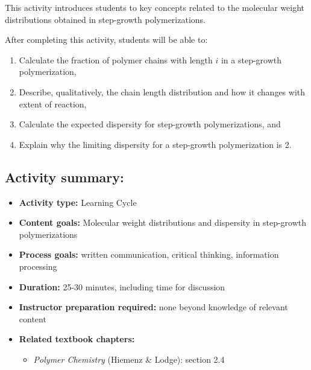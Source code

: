 %
%
%
%

\renewcommand{\figpath}{content/polymchem/stepgrowth/dispersity/figs}

\begin{activity}

\begin{instructornotes}

	This activity introduces students to key concepts related to the molecular weight distributions obtained in step-growth polymerizations.
	
	After completing this activity, students will be able to:
			\begin{enumerate}
				\item Calculate the fraction of polymer chains with length $i$ in a step-growth polymerization,
				\item Describe, qualitatively, the chain length distribution and how it changes with extent of reaction,
				\item Calculate the expected dispersity for step-growth polymerizations, and
				\item Explain why the limiting dispersity for a step-growth polymerization is 2.
			\end{enumerate}
			
	\subsection*{Activity summary:}
	\begin{itemize}
		\item \textbf{Activity type:} Learning Cycle
		\item \textbf{Content goals:} Molecular weight distributions and dispersity in step-growth polymerizations
		\item \textbf{Process goals:} %
			written communication, critical thinking, information processing
		\item \textbf{Duration:} 25-30 minutes, including time for discussion
		\item \textbf{Instructor preparation required:} none beyond knowledge of relevant content
		\item \textbf{Related textbook chapters:}
			\begin{itemize}
				\item \emph{Polymer Chemistry} (Hiemenz \& Lodge): section 2.4
			\end{itemize}
	\end{itemize}


\end{instructornotes}
\end{activity}
